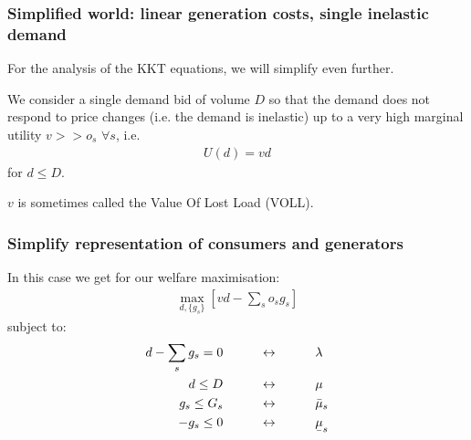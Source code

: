 \documentclass[10pt,aspectratio=169,dvipsnames]{beamer}
\def\l{\lambda}
\def\m{\mu}
\newcommand{\ubar}[1]{\text{\b{$#1$}}}
\begin{document}
\begin{frame}[fragile]
  \frametitle{Simplified world: linear generation costs, single inelastic demand}

  For the analysis of the KKT equations, we will simplify even further.

  We consider a single demand bid of volume $D$ so that the demand does not respond to price changes (i.e. the demand is \alert{inelastic}) up to a very high marginal utility $v >> o_s\,\, \forall s$, i.e.
  \begin{align*}
    U(d) = vd
  \end{align*}
  for $d\leq D$.

  $v$ is sometimes called the \alert{Value Of Lost Load (VOLL)}.
\end{frame}


\begin{frame}[fragile]
  \frametitle{Simplify representation of consumers and generators}

  In this case we get for our welfare maximisation:
  \begin{align*}
    \max_{d, \{g_s\} }\left[ vd  -  \sum_s o_s g_s \right]
  \end{align*}
  subject to:
  \begin{align*}
    d -  \sum_s g_s   = 0 \hspace{1cm} & \leftrightarrow \hspace{1cm} \l \\
    d  \leq D  \hspace{1cm}  & \leftrightarrow \hspace{1cm} \m \\
        g_s   \leq  G_s  \hspace{1cm}& \leftrightarrow\hspace{1cm} \bar{\m}_s \\
    - g_s   \leq  0   \hspace{1cm}& \leftrightarrow\hspace{1cm} \ubar{\m}_s
  \end{align*}

\end{frame}
\end{document}
